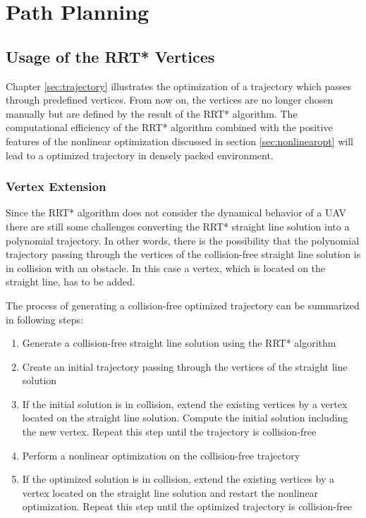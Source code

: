 \chapter{Path Planning}\label{chap:Planning}

\section{Usage of the RRT* Vertices}

Chapter \ref{sec:trajectory} illustrates the optimization of a trajectory which passes through predefined vertices. From now on, the vertices are no longer chosen manually but are defined by the result of the RRT* algorithm. The computational efficiency of the RRT* algorithm combined with the positive features of the nonlinear optimization discussed in section \ref{sec:nonlinearopt} will lead to a optimized trajectory in densely packed environment.

\subsection{Vertex Extension}


Since the RRT* algorithm does not consider the dynamical behavior of a UAV there are still some challenges converting the RRT* straight line solution into a polynomial trajectory. In other words, there is the possibility that the polynomial trajectory passing through the vertices of the collision-free straight line solution is in collision with an obstacle. In this case a vertex, which is located on the straight line, has to be added. \newline

The process of generating a collision-free optimized trajectory can be summarized in following steps:


\begin{enumerate}
  \item Generate a collision-free straight line solution using the RRT* algorithm
  \item Create an initial trajectory passing through the vertices of the straight line solution
  \item If the initial solution is in collision, extend the existing vertices by a vertex located on the straight line solution. Compute the initial solution including the new vertex. Repeat this step until the trajectory is collision-free
\item Perform a nonlinear optimization on the collision-free trajectory
\item If the optimized solution is in collision, extend the existing vertices by a vertex located on the straight line solution and restart the nonlinear optimization. Repeat this step until the optimized trajectory is collision-free
\end{enumerate}

